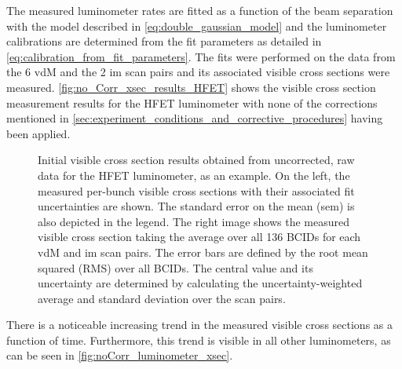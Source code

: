 The measured luminometer rates are fitted as a function of the beam separation with the model described in \autoref{eq:double_gaussian_model} and the luminometer calibrations are determined from the fit parameters as detailed in \autoref{eq:calibration_from_fit_parameters}. The fits were performed on the data from the 6 vdM and the 2 im scan pairs and its associated visible cross sections were measured. \autoref{fig:no_Corr_xsec_results_HFET} shows the visible cross section measurement results for the HFET luminometer with none of the corrections mentioned in \autoref{sec:experiment_conditions_and_corrective_procedures} having been applied.

\begin{figure}[!htb]
	\centering
	\caption[Initial HFET visible cross section results]{Initial visible cross section results obtained from uncorrected, raw data for the HFET luminometer, as an example. On the left, the measured per-bunch visible cross sections with their associated fit uncertainties are shown. The standard error on the mean (sem) is also depicted in the legend. The right image shows the measured visible cross section taking the average over all 136 BCIDs for each vdM and im scan pairs. The error bars are defined by the root mean squared (RMS) over all BCIDs. The central value and its uncertainty are determined by calculating the uncertainty-weighted average and  standard deviation over the scan pairs.}
	\label{fig:no_Corr_xsec_results_HFET}
\end{figure}

There is a noticeable increasing trend in the measured visible cross sections as a function of time. Furthermore, this trend is visible in all other luminometers, as can be seen in \autoref{fig:noCorr_luminometer_xsec}.

